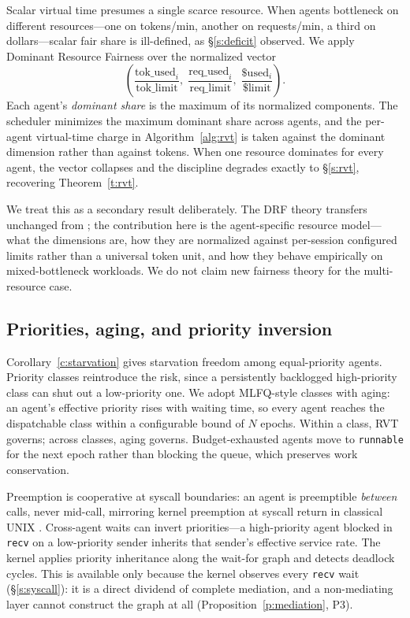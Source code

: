 \documentclass[letterpaper,11pt,leqno]{article}
\begin{document}
Scalar virtual time presumes a single scarce resource. When agents bottleneck on different resources---one on tokens/min, another on requests/min, a third on dollars---scalar fair share is ill-defined, as \S\ref{s:deficit} observed. We apply Dominant Resource Fairness \citep{Ghodsi11} over the normalized vector
\[
  \left(\frac{\mathrm{tok\_used}_i}{\mathrm{tok\_limit}}, \; \frac{\mathrm{req\_used}_i}{\mathrm{req\_limit}}, \; \frac{\$\mathrm{used}_i}{\$\mathrm{limit}}\right).
\]
Each agent's \emph{dominant share} is the maximum of its normalized components. The scheduler minimizes the maximum dominant share across agents, and the per-agent virtual-time charge in Algorithm~\ref{alg:rvt} is taken against the dominant dimension rather than against tokens. When one resource dominates for every agent, the vector collapses and the discipline degrades exactly to \S\ref{s:rvt}, recovering Theorem~\ref{t:rvt}.

We treat this as a secondary result deliberately. The DRF theory transfers unchanged from \citep{Ghodsi11}; the contribution here is the agent-specific resource model---what the dimensions are, how they are normalized against per-session configured limits rather than a universal token unit, and how they behave empirically on mixed-bottleneck workloads. We do not claim new fairness theory for the multi-resource case.

\subsection{Priorities, aging, and priority inversion}\label{s:priorities}

Corollary~\ref{c:starvation} gives starvation freedom among equal-priority agents. Priority classes reintroduce the risk, since a persistently backlogged high-priority class can shut out a low-priority one. We adopt MLFQ-style classes \citep{Corbato62, Arpaci18} with aging: an agent's effective priority rises with waiting time, so every agent reaches the dispatchable class within a configurable bound of $N$ epochs. Within a class, RVT governs; across classes, aging governs. Budget-exhausted agents move to \texttt{runnable} for the next epoch rather than blocking the queue, which preserves work conservation.

Preemption is cooperative at syscall boundaries: an agent is preemptible \emph{between} calls, never mid-call, mirroring kernel preemption at syscall return in classical UNIX \citep{Ritchie74}. Cross-agent waits can invert priorities---a high-priority agent blocked in \texttt{recv} on a low-priority sender inherits that sender's effective service rate. The kernel applies priority inheritance along the wait-for graph and detects deadlock cycles. This is available only because the kernel observes every \texttt{recv} wait (\S\ref{s:syscall}): it is a direct dividend of complete mediation, and a non-mediating layer cannot construct the graph at all (Proposition~\ref{p:mediation}, P3).
\end{document}
